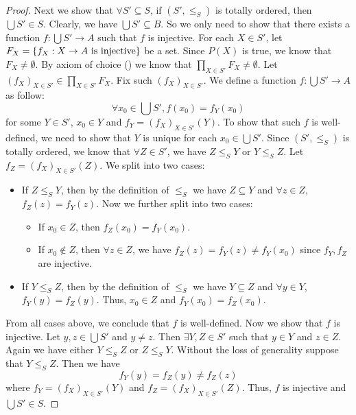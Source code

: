 \begin{proof}
  Next we show that \(\forall S' \subseteq S\), if \((S', \leq_S)\) is totally ordered, then \(\bigcup S' \in S\).
  Clearly, we have \(\bigcup S' \subseteq B\).
  So we only need to show that there exists a function \(f : \bigcup S' \to A\) such that \(f\) is injective.
  For each \(X \in S'\), let \(F_X = \left\lbrace f_X : X \to A \text{ is injective}\right\rbrace\) be a set.
  Since \(P(X)\) is true, we know that \(F_X \neq \emptyset\).
  By axiom of choice () we know that \(\prod_{X \in S'} F_X \neq \emptyset\).
  Let \((f_X)_{X \in S'} \in \prod_{X \in S'} F_X\).
  Fix such \((f_X)_{X \in S'}\).
  We define a function \(f : \bigcup S' \to A\) as follow:
  \[
    \forall x_0 \in \bigcup S', f(x_0) = f_Y(x_0)
  \]
  for some \(Y \in S'\), \(x_0 \in Y\) and \(f_Y = (f_X)_{X \in S'}(Y)\).
  To show that such \(f\) is well-defined, we need to show that \(Y\) is unique for each \(x_0 \in \bigcup S'\).
  Since \((S', \leq_S)\) is totally ordered, we know that \(\forall Z \in S'\), we have \(Z \leq_S Y\) or \(Y \leq_S Z\).
  Let \(f_Z = (f_X)_{X \in S'}(Z)\).
  We split into two cases:
  \begin{itemize}
    \item If \(Z \leq_S Y\), then by the definition of \(\leq_S\) we have \(Z \subseteq Y\) and \(\forall z \in Z\), \(f_Z(z) = f_Y(z)\).
          Now we further split into two cases:
          \begin{itemize}
            \item If \(x_0 \in Z\), then \(f_Z(x_0) = f_Y(x_0)\).
            \item If \(x_0 \notin Z\), then \(\forall z \in Z\), we have \(f_Z(z) = f_Y(z) \neq f_Y(x_0)\) since \(f_Y, f_Z\) are injective.
          \end{itemize}
    \item If \(Y \leq_S Z\), then by the definition of \(\leq_S\) we have \(Y \subseteq Z\) and \(\forall y \in Y\), \(f_Y(y) = f_Z(y)\).
          Thus, \(x_0 \in Z\) and \(f_Y(x_0) = f_Z(x_0)\).
  \end{itemize}
  From all cases above, we conclude that \(f\) is well-defined.
  Now we show that \(f\) is injective.
  Let \(y, z \in \bigcup S'\) and \(y \neq z\).
  Then \(\exists Y, Z \in S'\) such that \(y \in Y\) and \(z \in Z\).
  Again we have either \(Y \leq_S Z\) or \(Z \leq_S Y\).
  Without the loss of generality suppose that \(Y \leq_S Z\).
  Then we have
  \[
    f_Y(y) = f_Z(y) \neq f_Z(z)
  \]
  where \(f_Y = (f_X)_{X \in S'}(Y)\) and \(f_Z = (f_X)_{X \in S'}(Z)\).
  Thus, \(f\) is injective and \(\bigcup S' \in S\).


\end{proof}
